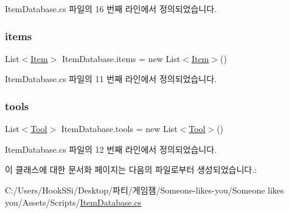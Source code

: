Item\+Database.\+cs 파일의 16 번째 라인에서 정의되었습니다.

\mbox{\label{class_item_database_aae8743202dc6def3345a1a6b400e70e4}} 
\subsubsection{\texorpdfstring{items}{items}}
{\footnotesize\ttfamily List$<$\mbox{\hyperlink{class_item}{Item}}$>$ Item\+Database.\+items = new List$<$\mbox{\hyperlink{class_item}{Item}}$>$()}



Item\+Database.\+cs 파일의 11 번째 라인에서 정의되었습니다.

\mbox{\label{class_item_database_a7cf2df2f86c863834ff3379c46748fb8}} 
\subsubsection{\texorpdfstring{tools}{tools}}
{\footnotesize\ttfamily List$<$\mbox{\hyperlink{class_tool}{Tool}}$>$ Item\+Database.\+tools = new List$<$\mbox{\hyperlink{class_tool}{Tool}}$>$()}



Item\+Database.\+cs 파일의 12 번째 라인에서 정의되었습니다.



이 클래스에 대한 문서화 페이지는 다음의 파일로부터 생성되었습니다.\+:\begin{DoxyCompactItemize}
\item 
C\+:/\+Users/\+Hook\+S\+Si/\+Desktop/파티/게임잼/\+Someone-\/likes-\/you/\+Someone likes you/\+Assets/\+Scripts/\mbox{\hyperlink{_item_database_8cs}{Item\+Database.\+cs}}\end{DoxyCompactItemize}
